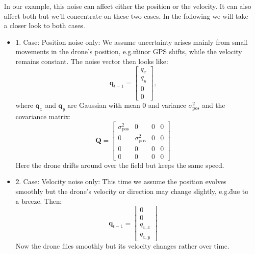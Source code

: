 \begin{example}
In our example, this noise can affect either the position or the velocity. It can also affect both but we'll concentrate on these two cases. In the following we will take a closer look to both cases. 

\begin{itemize}
    \item{1. Case: Position noise only:} We assume uncertainty arises mainly from small movements in the drone's position, e.g.\~minor GPS shifts, while the velocity remains constant. The noise vector then looks like:
    \[\mathbf{q}_{t-1} = \begin{bmatrix}
        q_x \\
        q_y \\
        0 \\
        0
    \end{bmatrix},\]
    where $\mathbf{q}_x$ and $\mathbf{q}_y$ are Gaussian with mean $0$ and variance $\sigma_\text{pos}^2$ and the covariance matrix: 
    \[\mathbf{Q}=\begin{bmatrix}
        \sigma_\text{pos}^2 & 0 & 0 & 0 \\
        0 & \sigma_\text{pos}^2 & 0 & 0 \\
        0 & 0 & 0 & 0 \\
        0 & 0 & 0 & 0 
    \end{bmatrix}\]
    Here the drone drifts around over the field but keeps the same speed. 
    
    \item{2. Case: Velocity noise only:} This time we assume the position evolves smoothly but the drone's velocity or direction may change slightly, e.g.\~due to a breeze. Then:
    \[\mathbf{q}_{t-1}= \begin{bmatrix}
        0 \\
        0 \\
        q_{v,x} \\
        q_{v,y}
    \end{bmatrix}\]
    Now the drone flies smoothly but its velocity changes rather over time. 
\end{itemize}
\end{example}




